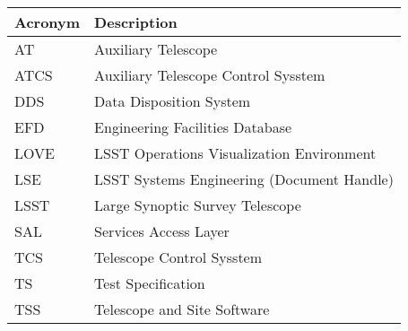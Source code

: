 \addtocounter{table}{-1}
\begin{longtable}{|l|p{}|}\hline
\textbf{Acronym} & \textbf{Description}  \\\hline

AT & Auxiliary Telescope \\\hline
ATCS & Auxiliary Telescope Control Sysstem \\\hline
DDS & Data Disposition System \\\hline
EFD & Engineering Facilities Database \\\hline
LOVE & LSST Operations Visualization Environment \\\hline
LSE & LSST Systems Engineering (Document Handle) \\\hline
LSST & Large Synoptic Survey Telescope \\\hline
SAL & Services Access Layer \\\hline
TCS & Telescope Control Sysstem \\\hline
TS & Test Specification \\\hline
TSS & Telescope and Site Software \\\hline
\end{longtable}
